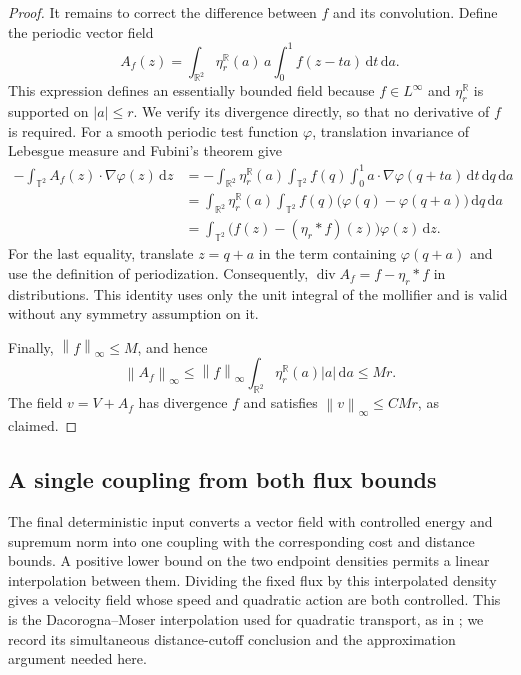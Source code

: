 \documentclass[11pt]{article}
\newcommand{\R}{\mathbb R}
\newcommand{\T}{\mathbb T^2}
\newcommand{\diver}{\operatorname{div}}
\newcommand{\norm}[1]{\left\lVert #1\right\rVert}
\newcommand{\abs}[1]{\left\lvert #1\right\rvert}
\theoremstyle{remark}
\numberwithin{equation}{section}
\begin{document}
\begin{proof}
It remains to correct the difference between \(f\) and its
convolution. Define the periodic vector field
\[
 A_f(z)=\int_{\R^2}\eta_r^{\R}(a)\,a
 \int_0^1 f(z-ta)\,\mathrm dt\,\mathrm da.
\]
This expression defines an essentially bounded field because
\(f\in L^\infty\) and \(\eta_r^{\R}\) is supported on
\(\abs a\le r\). We verify its divergence directly, so that no
derivative of \(f\) is required. For a smooth periodic test function
\(\varphi\), translation invariance of Lebesgue measure and Fubini's
theorem give
\begin{align*}
 -\int_{\T}A_f(z)\cdot\nabla\varphi(z)\,\mathrm dz
 &=-\int_{\R^2}\eta_r^{\R}(a)
   \int_{\T}f(q)\int_0^1
   a\cdot\nabla\varphi(q+ta)\,\mathrm dt\,\mathrm dq\,\mathrm da\\
 &=\int_{\R^2}\eta_r^{\R}(a)
   \int_{\T}f(q)\bigl(\varphi(q)-\varphi(q+a)\bigr)
   \,\mathrm dq\,\mathrm da\\
 &=\int_{\T}\bigl(f(z)-(\eta_r*f)(z)\bigr)
   \varphi(z)\,\mathrm dz.
\end{align*}
For the last equality, translate \(z=q+a\) in the term containing
\(\varphi(q+a)\) and use the definition of periodization. Consequently,
\(\diver A_f=f-\eta_r*f\) in distributions. This identity uses only
the unit integral of the mollifier and is valid without any symmetry
assumption on it.

Finally, \(\norm f_\infty\le M\), and hence
\[
 \norm{A_f}_\infty
 \le\norm f_\infty
     \int_{\R^2}\eta_r^{\R}(a)\abs a\,\mathrm da
 \le Mr.
\]
The field \(v=V+A_f\) has divergence \(f\) and satisfies
\(\norm v_\infty\le CMr\), as claimed.
\end{proof}

\subsection{A single coupling from both flux bounds}
\label{sec:flow}

The final deterministic input converts a vector field with controlled
energy and supremum norm into one coupling with the corresponding
cost and distance bounds. A positive lower bound on the two endpoint
densities permits a linear interpolation between them. Dividing the
fixed flux by this interpolated density gives a velocity field whose
speed and quadratic action are both controlled. This is the
Dacorogna--Moser interpolation used for quadratic transport, as in
\cite[Proposition~2.3]{AST19}; we record its simultaneous
distance-cutoff conclusion and the approximation argument needed here.
\end{document}
